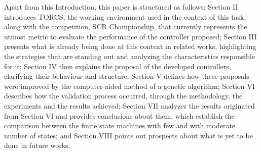 	Apart from this Introduction, this paper is structured as follows: Section II introduces TORCS, the working
	environment used in the context of this task, along with the competition, SCR Championship, that currently
	represents the utmost metric to evaluate the performance of the controller proposed; Section III presents what is
	already being done at this context in related works, highlighting the strategies that are standing out and
	analyzing the characteristics responsible for it; Section IV then explains the proposal of the developed
	controllers, clarifying their behaviour and structure; Section V defines how these proposals were improved by the
	computer-aided method of a genetic algorithm; Section VI describes how the validation process occurred, through
	the methodology, the experiments and the results achieved; Section VII analyzes the results originated from
	Section VI and provides conclusions about them, which establish the comparison between the finite state machines
	with few and with moderate number of states; and Section VIII points out prospects about what is yet to be done
	in future works.
